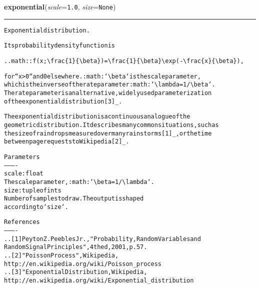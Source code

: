 \hspace{.8\funcindent}\begin{boxedminipage}{\funcwidth}

    \raggedright \textbf{exponential}(\textit{scale}={\tt 1.0}, \textit{size}={\tt None})

    \vspace{-1.5ex}

    \rule{\textwidth}{0.5\fboxrule}
\setlength{\parskip}{2ex}
\begin{alltt}
Exponential distribution.

Its probability density function is

.. math:: f(x; {\textbackslash}frac\{1\}\{{\textbackslash}beta\}) = {\textbackslash}frac\{1\}\{{\textbackslash}beta\} {\textbackslash}exp(-{\textbackslash}frac\{x\}\{{\textbackslash}beta\}),

for ``x {\textgreater} 0`` and 0 elsewhere. :math:`{\textbackslash}beta` is the scale parameter,
which is the inverse of the rate parameter :math:`{\textbackslash}lambda = 1/{\textbackslash}beta`.
The rate parameter is an alternative, widely used parameterization
of the exponential distribution [3]\_.

The exponential distribution is a continuous analogue of the
geometric distribution.  It describes many common situations, such as
the size of raindrops measured over many rainstorms [1]\_, or the time
between page requests to Wikipedia [2]\_.

Parameters
----------
scale : float
    The scale parameter, :math:`{\textbackslash}beta = 1/{\textbackslash}lambda`.
size : tuple of ints
    Number of samples to draw.  The output is shaped
    according to `size`.

References
----------
.. [1] Peyton Z. Peebles Jr., "Probability, Random Variables and
       Random Signal Principles", 4th ed, 2001, p. 57.
.. [2] "Poisson Process", Wikipedia,
       http://en.wikipedia.org/wiki/Poisson\_process
.. [3] "Exponential Distribution, Wikipedia,
       http://en.wikipedia.org/wiki/Exponential\_distribution
\end{alltt}

\setlength{\parskip}{1ex}
    \end{boxedminipage}

    \label{trunk:qstkutil:bollinger:f}

    \vspace{0.5ex}

